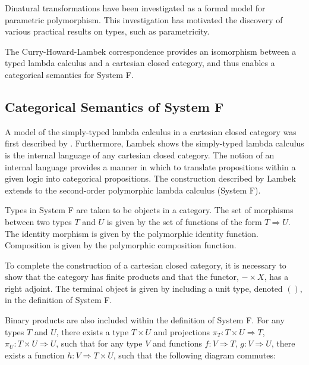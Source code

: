 \documentclass[../../Dissertation.tex]{subfiles}
\begin{document}
Dinatural transformations have been investigated as a formal model for parametric polymorphism. This investigation has motivated the discovery of various practical results on types, such as parametricity.
\par
The Curry-Howard-Lambek correspondence provides an isomorphism between a typed lambda calculus and a cartesian closed category, and thus enables a categorical semantics for System F.

\subsection{Categorical Semantics of System F}\label{sec:systemfcat}
A model of the simply-typed lambda calculus in a cartesian closed category was first described by . Furthermore, Lambek shows the simply-typed lambda calculus is the internal language of any cartesian closed category. The notion of an internal language provides a manner in which to translate propositions within a given logic into categorical propositions. The construction described by Lambek extends to the second-order polymorphic lambda calculus (System F).
\par
Types in System F are taken to be objects in a category. The set of morphisms between two types $T$ and $U$ is given by the set of functions of the form $T \Rightarrow U$. The identity morphism is given by the polymorphic identity function. Composition is given by the polymorphic composition function.
\par
To complete the construction of a cartesian closed category, it is necessary to show that the category has finite products and that the functor, $- \times X$, has a right adjoint. The terminal object is given by including a unit type, denoted $()$, in the definition of System F. 
\par
Binary products are also included within the definition of System F. For any types $T$ and $U$, there exists a type $T \times U$ and projections $\pi_{T} : T \times U \Rightarrow T$, $\pi_{U} : T \times U \Rightarrow U$, such that for any type $V$ and functions $f : V \Rightarrow T$, $g : V \Rightarrow U$, there exists a function $h : V \Rightarrow T \times U$, such that the following diagram commutes:
\end{document}
